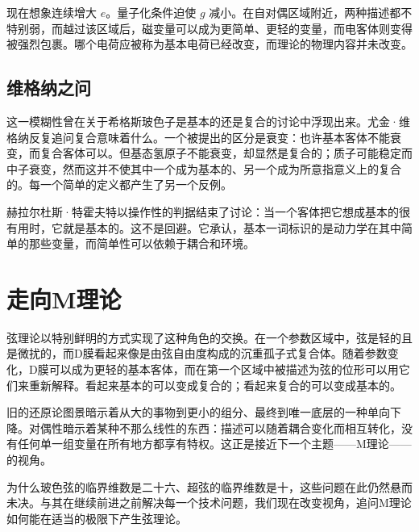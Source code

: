 现在想象连续增大 \(e\)。量子化条件迫使 \(g\) 减小。在自对偶区域附近，两种描述都不特别弱，而越过该区域后，磁变量可以成为更简单、更轻的变量，而电客体则变得被强烈包裹。哪个电荷应被称为基本电荷已经改变，而理论的物理内容并未改变。

\subsection{维格纳之问}

这一模糊性曾在关于希格斯玻色子是基本的还是复合的讨论中浮现出来。尤金·维格纳反复追问复合意味着什么。一个被提出的区分是衰变：也许基本客体不能衰变，而复合客体可以。但基态氢原子不能衰变，却显然是复合的；质子可能稳定而中子衰变，然而这并不使其中一个成为基本的、另一个成为所意指意义上的复合的。每一个简单的定义都产生了另一个反例。

赫拉尔杜斯·特霍夫特以操作性的判据结束了讨论：当一个客体把它想成基本的很有用时，它就是基本的。这不是回避。它承认，基本一词标识的是动力学在其中简单的那些变量，而简单性可以依赖于耦合和环境。

\section{走向M理论}

弦理论以特别鲜明的方式实现了这种角色的交换。在一个参数区域中，弦是轻的且是微扰的，而D膜看起来像是由弦自由度构成的沉重孤子式复合体。随着参数变化，D膜可以成为更轻的基本客体，而在第一个区域中被描述为弦的位形可以用它们来重新解释。看起来基本的可以变成复合的；看起来复合的可以变成基本的。

旧的还原论图景暗示着从大的事物到更小的组分、最终到唯一底层的一种单向下降。对偶性暗示着某种不那么线性的东西：描述可以随着耦合变化而相互转化，没有任何单一组变量在所有地方都享有特权。这正是接近下一个主题——M理论——的视角。

为什么玻色弦的临界维数是二十六、超弦的临界维数是十，这些问题在此仍然悬而未决。与其在继续前进之前解决每一个技术问题，我们现在改变视角，追问M理论如何能在适当的极限下产生弦理论。

